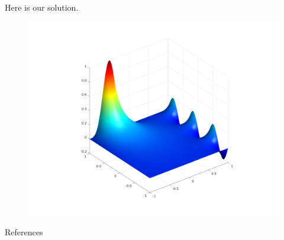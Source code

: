 \documentclass[xcolor={dvipsnames}]{beamer}
\begin{document}
\begin{frame}{Here is our solution.}{}
\begin{figure}
\centering
\includegraphics[width=\linewidth]{Figures/Laplace2D}
\label{fig:Laplace2D}
\end{figure}
\end{frame}

\begin{frame}{References}
\nocite{*}


\end{frame}
\end{document}
